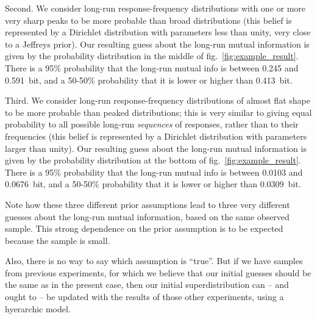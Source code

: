 \documentclass[\ifafour a4paper,12pt,\else a5paper,10pt,\fi%
onecolumn,oneside,article,%
british%
]{memoir}
\makeatletter
\theoremstyle{remark}
\theoremstyle{innote}
\def\sum{\DOTSI\sumop\slimits@}
\newcommand*{\de}{\partialup}%
\newcommand*{\p}{\mathrm{P}}%
\renewcommand*{\|}[1][]{\nonscript\,#1\vert\nonscript\;\mathopen{}}
\renewcommand*{\=}{\TextOrMath\texteq\eq}
\newcommand*{\fig}{fig.}%
\newcommand*{\tsum}{\mathop{\textstyle\sum}\nolimits}
\makeatother
\begin{document}
Second. We consider long-run response-frequency distributions with one or
more very sharp peaks to be more probable than broad distributions (this
belief is represented by a Dirichlet distribution with parameters less than
unity, very close to a Jeffreys prior). Our resulting guess about the
long-run mutual information is given by the probability distribution in the
middle of \fig~\ref{fig:example_result}. There is a 95\% probability that the
long-run mutual info is between 0.245 and 0.591~bit, and a 50-50\%
probability that it is lower or higher than 0.413~bit.

Third. We consider long-run response-frequency distributions of almost flat
shape to be more probable than peaked distributions; this is very similar
to giving equal probability to all possible long-run \emph{sequences} of
responses, rather than to their frequencies (this belief is represented by
a Dirichlet distribution with parameters larger than unity). Our resulting
guess about the long-run mutual information is given by the probability
distribution at the bottom of \fig~\ref{fig:example_result}. There is a
95\% probability that the long-run mutual info is between 0.0103 and
0.0676~bit, and a 50-50\% probability that it is lower or higher than
0.0309~bit.

\bigskip

Note how these three different prior assumptions lead to
three very different guesses about the long-run mutual information, based
on the same observed sample. This strong dependence on the prior assumption
is to be expected because the sample is small.

Also, there is no way to say which assumption is \enquote{true}. But if we
have samples from previous experiments, for which we believe that our
initial guesses should be the same as in the present case, then our initial
superdistribution can -- and ought to -- be updated with the results of
those other experiments, using a hyerarchic model.







\end{document}
